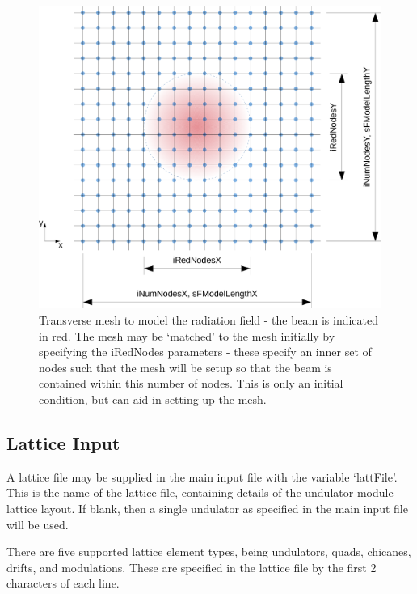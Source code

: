 \documentclass[12pt]{article}%
\begin{document}
\begin{figure}
\centering
\includegraphics[width=150mm]{trans_mesh2.png}
\caption{Transverse mesh to model the radiation field - the beam is indicated in red. The mesh may be `matched' to the mesh initially by specifying the iRedNodes parameters - these specify an inner set of nodes such that the mesh will be setup so that the beam is contained within this number of nodes. This is only an initial condition, but can aid in setting up the mesh.}
\label{trmsh}
\end{figure}



\subsection{Lattice Input}

A lattice file may be supplied in the main input file with the variable `lattFile'. This is the name of the lattice file, containing details of the undulator module lattice layout. If blank, then a single undulator as specified in the main input file will be used.

There are five supported lattice element types, being undulators, quads, chicanes, drifts, and modulations. These are specified in the lattice file by the first 2 characters of each line.
\end{document}

